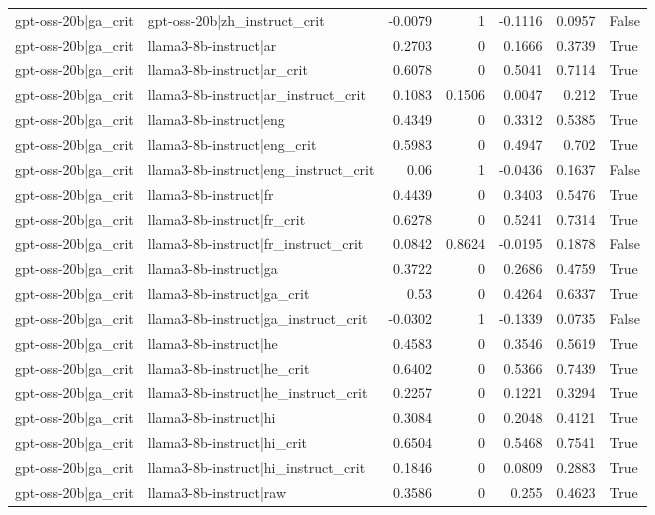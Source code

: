\begin{table}
\begin{tabular}{l l r r r r l}
gpt-oss-20b|ga_crit & gpt-oss-20b|zh_instruct_crit & -0.0079 & 1 & -0.1116 & 0.0957 & False \\
gpt-oss-20b|ga_crit & llama3-8b-instruct|ar & 0.2703 & 0 & 0.1666 & 0.3739 & True \\
gpt-oss-20b|ga_crit & llama3-8b-instruct|ar_crit & 0.6078 & 0 & 0.5041 & 0.7114 & True \\
gpt-oss-20b|ga_crit & llama3-8b-instruct|ar_instruct_crit & 0.1083 & 0.1506 & 0.0047 & 0.212 & True \\
gpt-oss-20b|ga_crit & llama3-8b-instruct|eng & 0.4349 & 0 & 0.3312 & 0.5385 & True \\
gpt-oss-20b|ga_crit & llama3-8b-instruct|eng_crit & 0.5983 & 0 & 0.4947 & 0.702 & True \\
gpt-oss-20b|ga_crit & llama3-8b-instruct|eng_instruct_crit & 0.06 & 1 & -0.0436 & 0.1637 & False \\
gpt-oss-20b|ga_crit & llama3-8b-instruct|fr & 0.4439 & 0 & 0.3403 & 0.5476 & True \\
gpt-oss-20b|ga_crit & llama3-8b-instruct|fr_crit & 0.6278 & 0 & 0.5241 & 0.7314 & True \\
gpt-oss-20b|ga_crit & llama3-8b-instruct|fr_instruct_crit & 0.0842 & 0.8624 & -0.0195 & 0.1878 & False \\
gpt-oss-20b|ga_crit & llama3-8b-instruct|ga & 0.3722 & 0 & 0.2686 & 0.4759 & True \\
gpt-oss-20b|ga_crit & llama3-8b-instruct|ga_crit & 0.53 & 0 & 0.4264 & 0.6337 & True \\
gpt-oss-20b|ga_crit & llama3-8b-instruct|ga_instruct_crit & -0.0302 & 1 & -0.1339 & 0.0735 & False \\
gpt-oss-20b|ga_crit & llama3-8b-instruct|he & 0.4583 & 0 & 0.3546 & 0.5619 & True \\
gpt-oss-20b|ga_crit & llama3-8b-instruct|he_crit & 0.6402 & 0 & 0.5366 & 0.7439 & True \\
gpt-oss-20b|ga_crit & llama3-8b-instruct|he_instruct_crit & 0.2257 & 0 & 0.1221 & 0.3294 & True \\
gpt-oss-20b|ga_crit & llama3-8b-instruct|hi & 0.3084 & 0 & 0.2048 & 0.4121 & True \\
gpt-oss-20b|ga_crit & llama3-8b-instruct|hi_crit & 0.6504 & 0 & 0.5468 & 0.7541 & True \\
gpt-oss-20b|ga_crit & llama3-8b-instruct|hi_instruct_crit & 0.1846 & 0 & 0.0809 & 0.2883 & True \\
gpt-oss-20b|ga_crit & llama3-8b-instruct|raw & 0.3586 & 0 & 0.255 & 0.4623 & True \\

\end{tabular}
\end{table}
